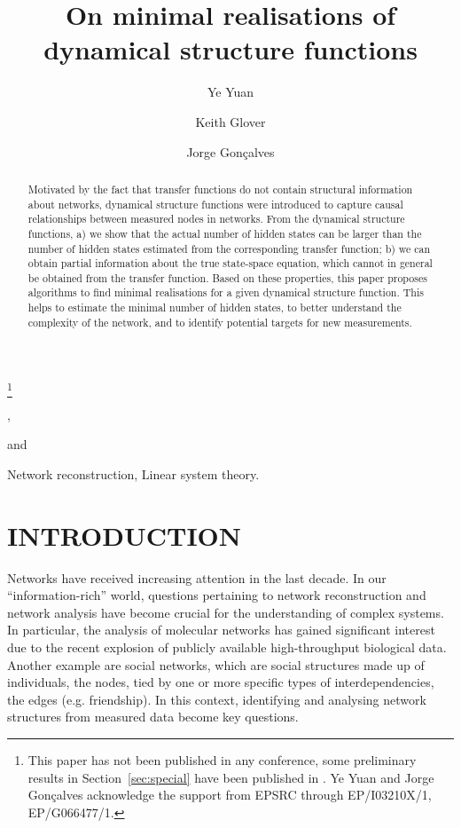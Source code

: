 \documentclass[twocolumn,12pt]{autart}
\theoremstyle{plain}
\begin{document}
\begin{frontmatter}
\title{On minimal realisations of dynamical structure functions}\thanks{This paper has not been published in any conference, some preliminary results in Section~\ref{sec:special} have been published in \cite{yetac}. Ye Yuan and Jorge Gon\c{c}alves acknowledge the support from EPSRC through EP/I03210X/1, EP/G066477/1.
}
\author[1]{Ye Yuan}, \author[1]{Keith Glover} and \author[1,2]{Jorge Gon\c{c}alves}
\maketitle
\address[1]{Control Group, Department of Engineering, University of Cambridge, UK.} 
\address[2]{Luxembourg Centre for Systems Biomedicine, Luxembourg.}      

\begin{abstract}
Motivated by the fact that transfer functions do not contain structural information about networks, dynamical structure functions were introduced to capture causal relationships between measured nodes in networks. From the dynamical structure functions, a) we show that the actual number of hidden states can be larger than the number of hidden states estimated from the corresponding transfer function; b) we can obtain partial information about the true state-space equation, which cannot in general be obtained from the transfer function. Based on these properties, this paper proposes algorithms to find minimal realisations for a given dynamical structure function. This helps to estimate the minimal number of hidden states, to better understand the complexity of the network, and to identify potential targets for new measurements.
\end{abstract}
\begin{keyword}
 Network reconstruction, Linear system theory.
 \end{keyword}
\end{frontmatter}

\section{INTRODUCTION}
Networks have received increasing attention in the last
decade. In our ``information-rich'' world, questions pertaining to network
reconstruction and network analysis have become crucial for the
understanding of complex systems. In particular, the analysis of molecular
networks has gained significant interest due to the recent explosion
of publicly available high-throughput biological data. Another example are social networks, which are social structures made up of individuals, the nodes, tied by one or more specific types of interdependencies, the edges (e.g. friendship).  
In this context, identifying and analysing network structures from measured data become key questions. 
\end{document}
